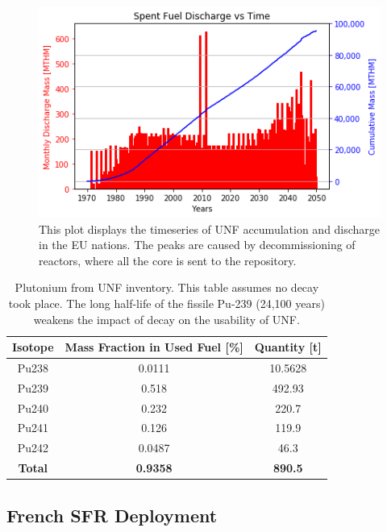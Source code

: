 \begin{figure}[htbp!]
	\begin{center}
			\includegraphics[scale=0.7]{./images/eu_future/snf_discharge.png}
	\end{center}
	\caption{This plot displays the timeseries of \gls{UNF} accumulation and discharge in the \gls{EU} nations.
			 The peaks are caused by decommissioning of reactors, where all the core is sent to the repository.}
	\label{fig:eu_snf}
\end{figure}
\FloatBarrier


\begin{table}[h]
	\centering
	\begin{tabular}{ccc}
		\hline
		\textbf{Isotope} & \textbf{Mass Fraction in Used Fuel [\%]} & \textbf{Quantity [t]} \\ \hline
		Pu238 & 0.0111 & 10.5628 \\ 
		Pu239 & 0.518 & 492.93 \\ 
		Pu240 & 0.232 & 220.7 \\ 
		Pu241 & 0.126 & 119.9 \\ 
		Pu242 & 0.0487 & 46.3 \\ \hline
		\textbf{Total} & \textbf{0.9358} & \textbf{890.5} \\ \hline
	\end{tabular}
	\caption{Plutonium from \gls{UNF} inventory. This table assumes no decay
			 took place. The long half-life of the fissile Pu-239 (24,100 years)
			 weakens the impact of decay on the usability of \gls{UNF}.}
	\label{tab:pu}
\end{table}



\subsection{French \gls{SFR} Deployment}

